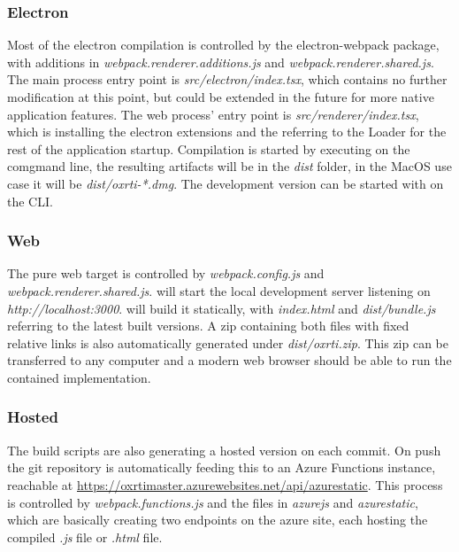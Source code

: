 \subsubsection{Electron}
Most of the electron compilation is controlled by the electron-webpack package,
with additions in \emph{webpack.renderer.additions.js} and
\emph{webpack.renderer.shared.js}. The main process entry point is
\emph{src/electron/index.tsx}, which contains no further modification at this
point, but could be extended in the future for more native application features.
The web process' entry point is \emph{src/renderer/index.tsx}, which is
installing the electron extensions and the referring to the Loader for the rest
of the application startup. Compilation is started by executing  on the comgmand line, the resulting artifacts will be
in the \emph{dist} folder, in the MacOS use case it will be
\emph{dist/oxrti-*.dmg}. The development version can be started with  on the CLI.

\subsubsection{Web}
The pure web target is controlled by \emph{webpack.config.js} and
\emph{webpack.renderer.shared.js}.  will start the local
development server listening on \emph{http://localhost:3000}. 
will build it statically, with \emph{index.html} and \emph{dist/bundle.js}
referring to the latest built versions. A zip containing both files with fixed
relative links is also automatically generated under \emph{dist/oxrti.zip}. This
zip can be transferred to any computer and a modern web browser should be able
to run the contained implementation.

\subsubsection{Hosted}
The build scripts are also generating a hosted version on each commit. On push
the git repository\cite*{goslar_oxrti:_2018} is automatically feeding this to an
Azure Functions instance, reachable at
\url{https://oxrtimaster.azurewebsites.net/api/azurestatic}. This process is
controlled by \emph{webpack.functions.js} and the files in \emph{azurejs} and
\emph{azurestatic}, which are basically creating two endpoints on the azure
site, each hosting the compiled \emph{.js} file or \emph{.html} file.

